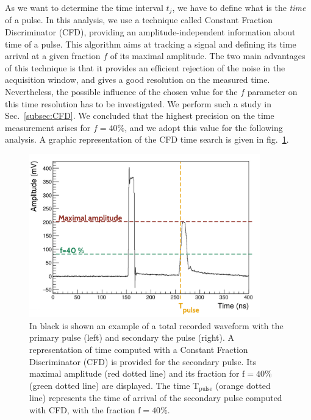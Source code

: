 As we want to determine the time interval $t_{j}$, we have to define what is the \emph{time} of a pulse.
In this analysis, we use a technique called Constant Fraction Discriminator (CFD), providing an amplitude-independent information about time of a pulse.
This algorithm aims at tracking a signal and defining its time arrival at a given fraction $f$ of its maximal amplitude.
The two main advantages of this technique is that it provides an efficient rejection of the noise in the acquisition window, and gives a good resolution on the measured time.
Nevertheless, the possible influence of the chosen value for the $f$ parameter on this time resolution has to be investigated.
We perform such a study in Sec.~\ref{subsec:CFD}.
We concluded that the highest precision on the time measurement arises for $f = 40\%$, and we adopt this value for the following analysis.
A graphic representation of the CFD time search is given in fig.~\ref{fig:CFD}.
\begin{figure}
  \centering
  \includegraphics[width=10cm]{commissioning/fig_commissioning/CFD_example.pdf}

  \caption{In black is shown an example of a total recorded waveform with the primary pulse (left) and secondary the pulse (right).
    A representation of time computed with a Constant Fraction Discriminator (CFD) is provided for the secondary pulse.
    Its maximal amplitude (red dotted line) and its fraction for $\text{f}=40\%$ (green dotted line) are displayed.
    The time $\text{T}_{\text{pulse}}$ (orange dotted line) represents the time of arrival of the secondary pulse computed with CFD, with the fraction $\text{f}=40\%$.
    \label{fig:CFD}}
\end{figure}

